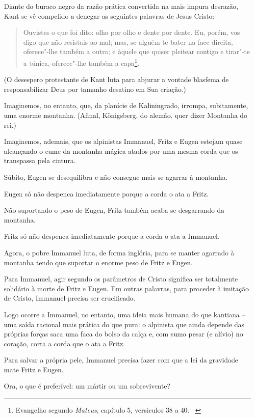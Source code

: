 Diante do buraco negro da razão prática convertida na mais impura
desrazão, Kant se vê compelido a denegar as seguintes palavras de Jesus
Cristo:

\begin{quote}
Ouvistes o que foi dito: olho por olho e dente por dente. Eu, porém, vos
digo que não resistais ao mal; mas, se alguém te bater na face direita,
oferece"-lhe também a outra; e àquele que quiser pleitear contigo e
tirar"-te a túnica, oferece"-lhe também a capa\footnote{Evangelho segundo
  \emph{Mateus}, capítulo 5, versículos 38 a 40. ~}.
\end{quote}

(O desespero protestante de Kant luta para abjurar a vontade blasfema de
responsabilizar Deus por tamanho desatino em Sua criação.)

Imaginemos, no entanto, que, da planície de Kaliningrado, irrompa,
subitamente, uma enorme montanha. (Afinal, Königsberg, do alemão, quer
dizer Montanha do rei.)

Imaginemos, ademais, que os alpinistas Immanuel, Fritz e Eugen estejam
quase alcançando o cume da montanha mágica atados por uma mesma corda
que os transpassa pela cintura.

Súbito, Eugen se desequilibra e não consegue mais se agarrar à montanha.

Eugen só não despenca imediatamente porque a corda o ata a Fritz.

Não suportando o peso de Eugen, Fritz também acaba se desgarrando da
montanha.

Fritz só não despenca imediatamente porque a corda o ata a Immanuel.

Agora, o pobre Immanuel luta, de forma inglória, para se manter agarrado
à montanha tendo que suportar o enorme peso de Fritz e Eugen.

Para Immanuel, agir segundo os parâmetros de Cristo significa ser
totalmente solidário à morte de Fritz e Eugen. Em outras palavras, para
proceder à imitação de Cristo, Immanuel precisa ser crucificado.

Logo ocorre a Immanuel, no entanto, uma ideia mais humana do que
kantiana -- uma saída racional mais prática do que pura: o alpinista que
ainda depende das próprias forças saca uma faca do bolso da calça e, com
sumo pesar (e alívio) no coração, corta a corda que o ata a Fritz.

Para salvar a própria pele, Immanuel precisa fazer com que a lei da
gravidade mate Fritz e Eugen.

Ora, o que é preferível: um mártir ou um sobrevivente?

